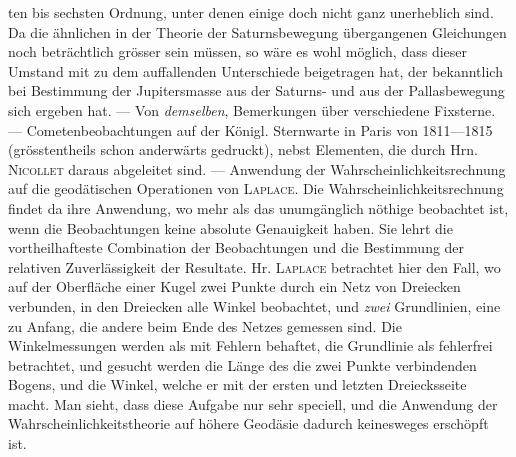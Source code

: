 \noindent ten bis sechsten Ordnung, unter denen einige doch nicht ganz unerheblich sind. Da die ähnlichen in der Theorie der Saturnsbewegung übergangenen Gleichungen noch beträchtlich grösser sein müssen, so wäre es wohl möglich, dass dieser Umstand mit zu dem auffallenden Unterschiede beigetragen hat, der bekanntlich bei Bestimmung der Jupitersmasse aus der Saturns- und aus der Pallasbewegung sich ergeben hat. --- Von \emph{demselben}, Bemerkungen über verschiedene Fixsterne. --- Cometenbeobachtungen auf der Königl. Sternwarte in Paris von 1811---1815 (grösstentheils schon anderwärts gedruckt), nebst Elementen, die durch Hrn. \textsc{Nicollet} daraus abgeleitet sind. --- Anwendung der Wahrscheinlichkeitsrechnung auf die geodätischen Operationen von \textsc{Laplace}. Die Wahrscheinlichkeitsrechnung findet da ihre Anwendung, wo mehr als das unumgänglich nöthige beobachtet ist, wenn die Beobachtungen keine absolute Genauigkeit haben. Sie lehrt die vortheilhafteste Combination der Beobachtungen und die Bestimmung der relativen Zuverlässigkeit der Resultate. Hr. \textsc{Laplace} betrachtet hier den Fall, wo auf der Oberfläche einer Kugel zwei Punkte durch ein Netz von Dreiecken verbunden, in den Dreiecken alle Winkel beobachtet, und \emph{zwei} Grundlinien, eine zu Anfang, die andere beim Ende des Netzes gemessen sind. Die Winkelmessungen werden als mit Fehlern behaftet, die Grundlinie als fehlerfrei betrachtet, und gesucht werden die Länge des die zwei Punkte verbindenden Bogens, und die Winkel, welche er mit der ersten und letzten Dreiecksseite macht. Man sieht, dass diese Aufgabe nur sehr speciell, und die Anwendung der Wahrscheinlichkeitstheorie auf höhere Geodäsie dadurch keinesweges erschöpft ist.
